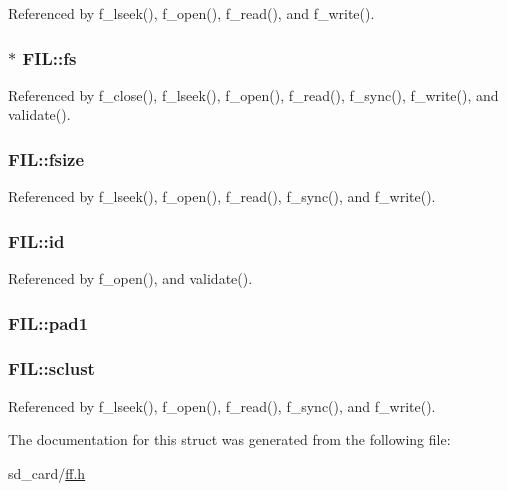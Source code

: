 Referenced by f\-\_\-lseek(), f\-\_\-open(), f\-\_\-read(), and f\-\_\-write().

\hypertarget{structFIL_a42376a6797a06228911c8b836c1e9030}{
\subsubsection[{fs}]{$\ast$ F\-I\-L\-::fs}}\label{structFIL_a42376a6797a06228911c8b836c1e9030}


Referenced by f\-\_\-close(), f\-\_\-lseek(), f\-\_\-open(), f\-\_\-read(), f\-\_\-sync(), f\-\_\-write(), and validate().

\hypertarget{structFIL_aa00790d40d7b0081c345fd4f76e22b70}{
\subsubsection[{fsize}]{ F\-I\-L\-::fsize}}\label{structFIL_aa00790d40d7b0081c345fd4f76e22b70}


Referenced by f\-\_\-lseek(), f\-\_\-open(), f\-\_\-read(), f\-\_\-sync(), and f\-\_\-write().

\hypertarget{structFIL_af7cae0063b0045fb7078b560101ba8f2}{
\subsubsection[{id}]{ F\-I\-L\-::id}}\label{structFIL_af7cae0063b0045fb7078b560101ba8f2}


Referenced by f\-\_\-open(), and validate().

\hypertarget{structFIL_a17f891ef69059bd879f6492473cfceae}{
\subsubsection[{pad1}]{ F\-I\-L\-::pad1}}\label{structFIL_a17f891ef69059bd879f6492473cfceae}
\hypertarget{structFIL_ad308b74c8d6975c6a9c30d90b4124c40}{
\subsubsection[{sclust}]{ F\-I\-L\-::sclust}}\label{structFIL_ad308b74c8d6975c6a9c30d90b4124c40}


Referenced by f\-\_\-lseek(), f\-\_\-open(), f\-\_\-read(), f\-\_\-sync(), and f\-\_\-write().



The documentation for this struct was generated from the following file\-:\begin{DoxyCompactItemize}
\item 
sd\-\_\-card/\hyperlink{ff_8h}{ff.\-h}\end{DoxyCompactItemize}
